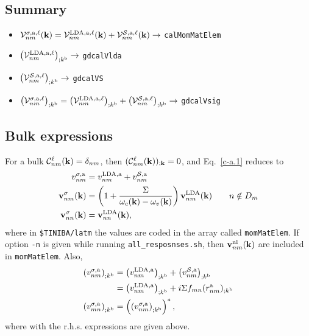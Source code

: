 \subsection{Summary}
\begin{itemize}
\item
${\mathbf{\cal V}}^{\sigma,\mathrm{a},\ell}_{nm}(\mathbf{k})={\mathbf{\cal V}}^{\mathrm{LDA},\mathrm{a},\ell}_{nm}(\mathbf{k})+{\mathbf{\cal V}}^{{\cal S},\mathrm{a},\ell}_{nm}(\mathbf{k})\to$
\verb=calMomMatElem= 

\item $\left({\mathbf{\cal V}}^{\mathrm{LDA},\mathrm{a},\ell}_{nm}\right)_{;k^{\mathrm{b}}}\to$
\verb=gdcalVlda= 

\item $\left({\mathbf{\cal V}}^{{\cal S},\mathrm{a},\ell}_{nm}\right)_{;k^{\mathrm{b}}}\to$ 
\verb=gdcalVS=

\item $\left({\mathbf{\cal V}}^{\sigma,\mathrm{a},\ell}_{nm}\right)_{;k^{\mathrm{b}}}=
\left({\mathbf{\cal V}}^{\mathrm{LDA},\mathrm{a},\ell}_{nm}\right)_{;k^{\mathrm{b}}}+\left({\mathbf{\cal V}}^{{\cal S},\mathrm{a},\ell}_{nm}\right)_{;k^{\mathrm{b}}}\to$ 
\verb=gdcalVsig=
\end{itemize}

\subsection{Bulk expressions}

For a bulk ${\mathbf{\cal C}}^\ell_{nm}(\mathbf{k})=\delta_{nm}$, then
$({\mathbf{\cal C}}^\ell_{nm}(\mathbf{k}))_{;\mathbf{k}}=0$, and Eq.~\eqref{c-a.1} reduces to
\begin{align}\label{choni.9}
v^{\sigma,\mathrm{a}}_{nm}
&=
v^{\mathrm{LDA},\mathrm{a}}_{nm}
+
v^{{\cal S},\mathrm{a}}_{nm}
\nonumber\\
\mathbf{v}^\sigma_{nm}(\mathbf{k})
&=
\left(1+\frac{\Sigma}{\omega_c(\mathbf{k})-\omega_v(\mathbf{k})}\right)\mathbf{v}^{\mathrm{LDA}}_{nm}(\mathbf{k})
\quad\quad n\notin D_m
\nonumber\\
\mathbf{v}^\sigma_{nn}(\mathbf{k})
&=
\mathbf{v}^{\mathrm{LDA}}_{nn}(\mathbf{k})
,
\end{align}
where in \verb=$TINIBA/latm= the values are coded in the array
called
\verb=momMatElem=.  
If option \verb=-n= is given while running
\verb=all_resposnses.sh=, then $\mathbf{v}^{\mathrm{nl}}_{nm}(\mathbf{k})$ are included in 
\verb=momMatElem=. 
Also,
\begin{align}\label{c-a.1nn}
\left(v^{\sigma,\mathrm{a}}_{nm}\right)_{;k^{\mathrm{b}}}
&=
\left(
v^{\mathrm{LDA},\mathrm{a}}_{nm}
\right)_{;k^{\mathrm{b}}}
+
\left(
v^{{\cal S},\mathrm{a}}_{nm}
\right)_{;k^{\mathrm{b}}}
\nonumber\\
&=
\left(
v^{\mathrm{LDA},\mathrm{a}}_{nm}
\right)_{;k^{\mathrm{b}}}
+
i\Sigma f_{mn}(r^{\mathrm{a}}_{nm})_{;k^{\mathrm{b}}}
\nonumber\\
\left(v^{\sigma,\mathrm{a}}_{mn}\right)_{;k^{\mathrm{b}}}
&=
\left(\left(v^{\sigma,\mathrm{a}}_{nm}\right)_{;k^{\mathrm{b}}}\right)^*
,
\end{align}
where with the r.h.s. expressions are given above. 


